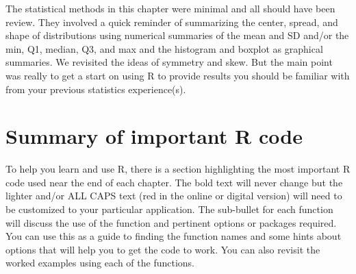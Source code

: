 \documentclass[]{book}
\renewcommand{\indent}{\hspace{15pt}}
\begin{document}
\indent The statistical methods in this chapter were minimal and all should have been
review. They involved a quick reminder of summarizing the center, spread, and
shape of distributions using numerical summaries of the mean and SD and/or the
min, Q1, median, Q3, and max and the histogram and boxplot as graphical
summaries. We revisited the ideas of symmetry and skew. But the main point was
really to get a start on using R to provide results you should be familiar with
from your previous statistics experience(s).

\hypertarget{section1-5}{%
\section{Summary of important R code}\label{section1-5}}

To help you learn and use R, there is a section highlighting the most important
R code used near the end of each
chapter. The bold text will never change but the
lighter and/or ALL CAPS text (red in the online or digital version) will need
to be customized to your particular application. The sub-bullet for each
function will discuss the use of the function and pertinent options or packages
required. You can use this as a guide to finding the function names and some
hints about options that will help you to get the code to work. You can also
revisit the worked examples using each of the functions.
\end{document}
